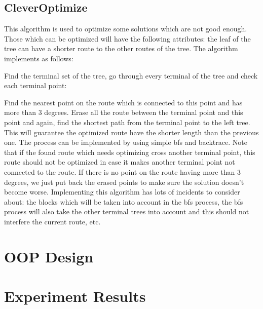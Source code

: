 \documentclass[12pt, a4paper]{article}
\begin{document}
	\subsection{CleverOptimize}
		
		This algorithm is used to optimize some solutions which are not good enough. Those which can be optimized will have the following attributes: the leaf of the tree can have a shorter route to the other routes of the tree. The algorithm implements as follows:
		
		Find the terminal set of the tree, go through every terminal of the tree and check each terminal point:
			
			Find the nearest point on the route which is connected to this point and has more than 3 degrees. Erase all the route between the terminal point and this point and again, find the shortest path from the terminal point to the left tree. This will guarantee the optimized route have the shorter length than the previous one. The process can be implemented by using simple bfs and backtrace. Note that if the found route which needs optimizing cross another terminal point, this route should not be optimized in case it makes another terminal point not connected to the route. If there is no point on the route having more than 3 degrees, we just put back the erased points to make sure the solution doesn't become worse. Implementing this algorithm has lots of incidents to consider about: the blocks which will be taken into account in the bfs process, the bfs process will also take the other terminal trees into account and this should not interfere the current route, etc.
	
	\section{OOP Design}
	
	\section{Experiment Results}
\end{document}
